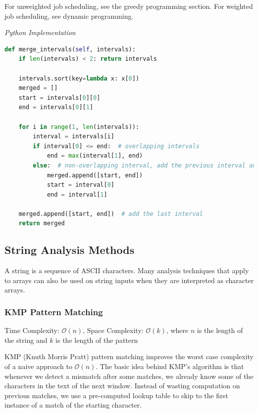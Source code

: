 \documentclass{article}
\newcommand{\bigO}{\mathcal{O}}
\begin{document}
    For unweighted job scheduling, see the greedy programming section. For weighted job scheduling, see dynamic programming. 
    
\vspace{8pt} \emph{Python Implementation}
\begin{lstlisting}[language=Python]
def merge_intervals(self, intervals):
    if len(intervals) < 2: return intervals

    intervals.sort(key=lambda x: x[0])
    merged = []
    start = intervals[0][0]
    end = intervals[0][1]

    for i in range(1, len(intervals)):
        interval = intervals[i]
        if interval[0] <= end:  # overlapping intervals
            end = max(interval[1], end)
        else:  # non-overlapping interval, add the previous interval and reset
            merged.append([start, end])
            start = interval[0]
            end = interval[1]

    merged.append([start, end])  # add the last interval
    return merged
\end{lstlisting}
    
    
    \subsection{String Analysis Methods}
    A string is a sequence of ASCII characters. Many analysis techniques that apply to arrays can also be used on string inputs when they are interpreted as character arrays.
    
    \subsubsection{KMP Pattern Matching}
    Time Complexity: $\bigO(n)$, Space Complexity: $\bigO(k)$, where $n$ is the length of the string and $k$ is the length of the pattern
    
    KMP (Knuth Morris Pratt) pattern matching improves the worst case complexity of a naive approach to $\bigO(n)$. The basic idea behind KMP’s algorithm is that whenever we detect a mismatch after some matches, we already know some of the characters in the text of the next window. Instead of wasting computation on previous matches, we use a pre-computed lookup table to skip to the first instance of a match of the starting character.
    
\end{document}
